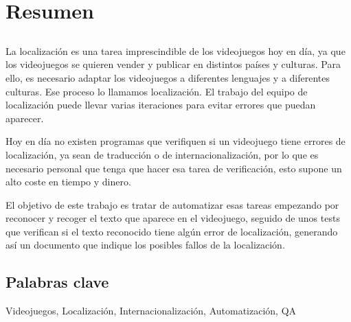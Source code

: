 \chapter*{Resumen}

\section*{\tituloPortadaVal}

La localización es una tarea imprescindible de los videojuegos hoy en día, ya que los videojuegos se quieren vender y publicar en distintos países y culturas. Para ello, es necesario adaptar los videojuegos a diferentes lenguajes y a diferentes culturas. Ese proceso lo llamamos localización. El trabajo del equipo de localización puede llevar varias iteraciones  para evitar errores que puedan aparecer.

Hoy en día no existen programas que verifiquen si un videojuego tiene errores de localización, ya sean de traducción o de internacionalización, por lo que es necesario personal que tenga que hacer esa tarea de verificación, esto supone un alto coste en tiempo y dinero.

El objetivo de este trabajo es tratar de automatizar esas tareas empezando por reconocer y recoger el texto que aparece en el videojuego, seguido de unos tests que verifican si el texto reconocido tiene algún error de localización, generando así un documento que indique los posibles fallos de la localización.



\section*{Palabras clave}
   
\noindent Videojuegos, Localización, Internacionalización, Automatización, QA

   


